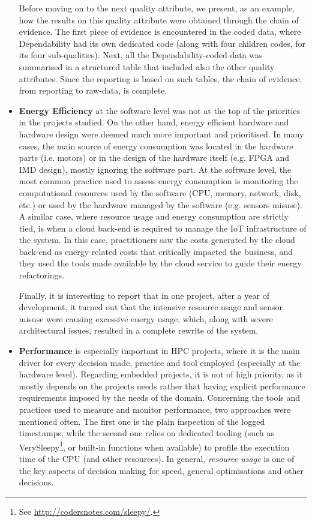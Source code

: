 \begin{itemize}
    Before moving on to the next quality attribute, we present, as an example, how the results on this quality attribute were obtained through the chain of evidence.
    The first piece of evidence is encountered in the coded data, where Dependability had its own dedicated code (along with four children codes, for its four sub-qualities). Next, all the Dependability-coded data was summarised in a structured table that included also the other quality attributes. Since the reporting is based on such tables, the chain of evidence, from reporting to raw-data, is complete.

    \item \textbf{Energy Efficiency} at the software level was not at the top of the priorities in the projects studied.
    On the other hand, energy efficient hardware and hardware design were deemed much more important and prioritised.
    In many cases, the main source of energy consumption was located in the hardware parts (i.e. motors) or in the design of the hardware itself (e.g. FPGA and IMD design), mostly ignoring the software part.
    At the software level, the most common practice used to assess energy consumption is monitoring the computational resources used by the software (CPU, memory, network, disk, etc.) or used by the hardware managed by the software (e.g. sensors misuse).
    A similar case, where resource usage and energy consumption are strictly tied, is when a cloud back-end is required to manage the IoT infrastructure of the system. In this case, practitioners saw the costs generated by the cloud back-end as energy-related costs that critically impacted the business, and they used the tools made available by the cloud service to guide their energy refactorings. 
    
    Finally, it is interesting to report that in one project, after a year of development, it turned out that the intensive resource usage and sensor misuse were causing excessive energy usage, which, along with severe architectural issues, resulted in a complete rewrite of the system.

    
    \item \textbf{Performance} is especially important in HPC projects, where it is the main driver for every decision made, practice and tool employed (especially at the hardware level).
    Regarding embedded projects, it is not of high priority, as it mostly depends on the projects needs rather that having explicit performance requirements imposed by the needs of the domain.
    Concerning the tools and practices used to measure and monitor performance, two approaches were mentioned often.
    The first one is the plain inspection of the logged timestamps, while the second one relies on dedicated tooling (such as VerySleepy\footnote{See \url{http://codersnotes.com/sleepy/}.}, or built-in functions when available) to profile the execution time of the CPU (and other resources).
    In general, \textit{resource usage} is one of the key aspects of decision making for speed, general optimisations and other decisions.
\end{itemize}


